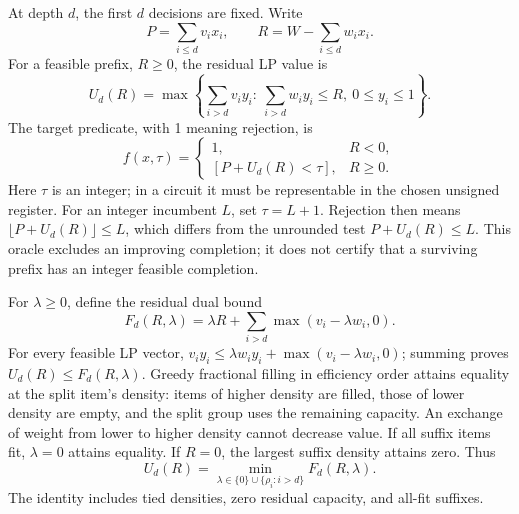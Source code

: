 \documentclass[referee,pdflatex,sn-mathphys-num]{sn-jnl}
\theoremstyle{thmstyleone}
\theoremstyle{thmstyletwo}
\begin{document}
At depth $d$, the first $d$ decisions are fixed. Write
\begin{equation}
 P=\sum_{i\leq d}v_ix_i,\qquad R=W-\sum_{i\leq d}w_ix_i.
\end{equation}
For a feasible prefix, $R\geq0$, the residual LP value is
\begin{equation}\label{eq:lp}
 U_d(R)=\max\left\{\sum_{i>d}v_i y_i:\ \sum_{i>d}w_i y_i\leq R,\ 0\leq y_i\leq1\right\}.
\end{equation}
The target predicate, with 1 meaning rejection, is
\begin{equation}\label{eq:predicate}
 f(x,\tau)=\begin{cases}
 1,&R<0,\\
 [P+U_d(R)<\tau],&R\geq0.
 \end{cases}
\end{equation}
Here $\tau$ is an integer; in a circuit it must be representable in the chosen unsigned register. For an integer incumbent $L$, set $\tau=L+1$. Rejection then means $\lfloor P+U_d(R)\rfloor\leq L$, which differs from the unrounded test $P+U_d(R)\leq L$. This oracle excludes an improving completion; it does not certify that a surviving prefix has an integer feasible completion.

For $\lambda\geq0$, define the residual dual bound
\begin{equation}\label{eq:dual}
 F_d(R,\lambda)=\lambda R+\sum_{i>d}\max(v_i-\lambda w_i,0).
\end{equation}
For every feasible LP vector, $v_i y_i\leq\lambda w_i y_i+\max(v_i-\lambda w_i,0)$; summing proves $U_d(R)\leq F_d(R,\lambda)$. Greedy fractional filling in efficiency order attains equality at the split item's density: items of higher density are filled, those of lower density are empty, and the split group uses the remaining capacity. An exchange of weight from lower to higher density cannot decrease value. If all suffix items fit, $\lambda=0$ attains equality. If $R=0$, the largest suffix density attains zero. Thus
\begin{equation}\label{eq:dualequality}
 U_d(R)=\min_{\lambda\in\{0\}\cup\{\rho_i:i>d\}}F_d(R,\lambda).
\end{equation}
The identity includes tied densities, zero residual capacity, and all-fit suffixes.
\end{document}
